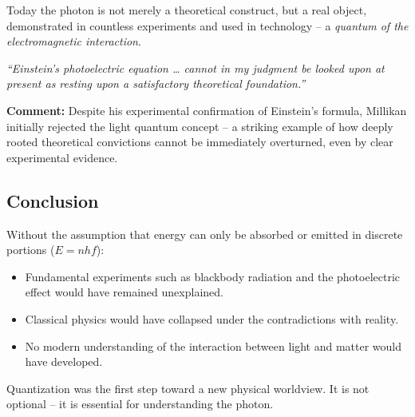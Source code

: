 Today the photon is not merely a theoretical construct, but a real object, demonstrated in countless experiments and used in technology – a \emph{quantum of the electromagnetic interaction}.

\vspace{1em}
\begin{tcolorbox}[physikbox, title=Robert A. Millikan on Einstein (1916) \cite{millikan_1916}]
	\label{box:millikan-einstein}
	\emph{“Einstein’s photoelectric equation … cannot in my judgment be looked upon at present as resting upon a satisfactory theoretical foundation.”}
	
	\vspace{6pt}
	\textbf{Comment:} Despite his experimental confirmation of Einstein’s formula, Millikan initially rejected the light quantum concept – a striking example of how deeply rooted theoretical convictions cannot be immediately overturned, even by clear experimental evidence.
\end{tcolorbox}
\subsection{Conclusion}
\vspace{1em}
\begin{tcolorbox}[hypobox, title={What If There Were No Quantization?}]
	\label{box:hypo-keine-quanten}
	Without the assumption that energy can only be absorbed or emitted in discrete portions ($E = nhf$):
	\begin{itemize}
		\item Fundamental experiments such as blackbody radiation and the photoelectric effect would have remained unexplained.
		\item Classical physics would have collapsed under the contradictions with reality.
		\item No modern understanding of the interaction between light and matter would have developed.
	\end{itemize}
	Quantization was the first step toward a new physical worldview. It is not optional – it is essential for understanding the photon.
\end{tcolorbox}

